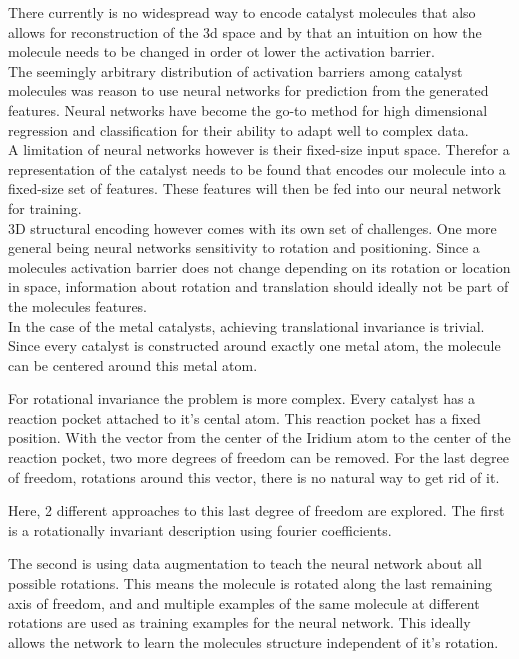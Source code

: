 There currently is no widespread way to encode catalyst molecules that also allows for 
reconstruction of the 3d space and by that an intuition on how the molecule needs to be changed in order ot lower the activation barrier.
\\
The seemingly arbitrary distribution of activation barriers among catalyst molecules  was reason to use neural networks for prediction from the generated features.
Neural networks have become the go-to method for high dimensional regression and classification for their ability to adapt well to complex data.
\\
A limitation of neural networks however is their fixed-size input space.
Therefor a representation of the catalyst needs to be found that encodes our molecule into a fixed-size set of features.
These features will then be fed into our neural network for training. 
\\
3D structural encoding however comes with its own set of challenges. 
One more general being neural networks sensitivity to rotation and positioning.
Since a molecules activation barrier does not change depending on its rotation or location in space, 
information about rotation and translation should ideally not be part of the molecules features.
\\
In the case of the metal catalysts, achieving translational invariance is trivial.
Since every catalyst is constructed around exactly one metal atom, the molecule can be centered around this metal atom.

For rotational invariance the problem is more complex.
Every catalyst has a reaction pocket attached to it's cental atom.
This reaction pocket has a fixed position.
With the vector from the center of the Iridium atom to the center of the reaction pocket, two more degrees of freedom can be removed.
For the last degree of freedom, rotations around this vector, there is no natural way to get rid of it.

Here, 2 different approaches to this last degree of freedom are explored.
The first is a rotationally invariant description using fourier coefficients.

The second is using data augmentation to teach the neural network about all possible rotations.
This means the molecule is rotated along the last remaining axis of freedom, and and multiple examples of the same molecule at different rotations are used as training examples for the neural network.
This ideally allows the network to learn the molecules structure independent of it's rotation.



